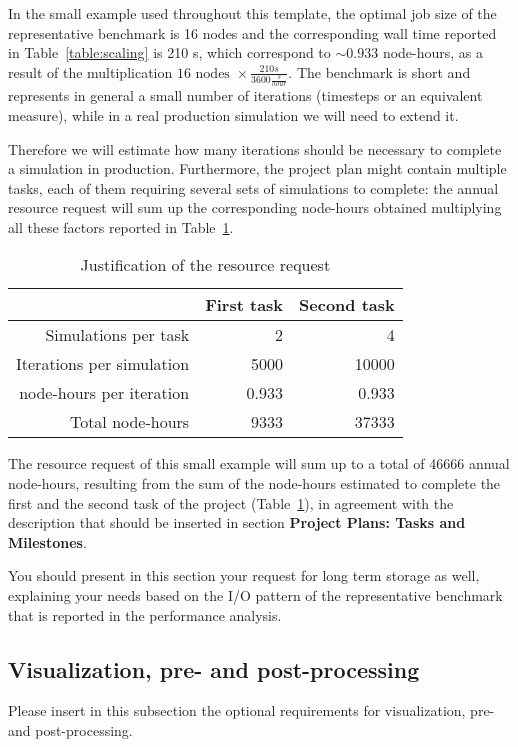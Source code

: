 \documentclass[11pt]{article}
\begin{document}
In the small example used throughout this template, the optimal job size of the representative 
benchmark is 16 nodes and the corresponding wall time reported in Table~\ref{table:scaling} is 
210 s, which correspond to $\sim 0.933$ node-hours, as a result of the multiplication 
$16 \mbox { nodes } \times \frac{210 s}{3600 \frac{s}{hour}}$. 
The benchmark is short and represents in general a small number of iterations (timesteps or 
an equivalent measure), while in a real production simulation we will need to extend it.

Therefore we will estimate how many iterations should be necessary to complete a simulation 
in production. Furthermore, the project plan might contain multiple tasks, each of them requiring 
several sets of simulations to complete: the annual resource request will sum up the corresponding 
node-hours obtained multiplying all these factors reported in Table~\ref{table:resource_request}. 
\begin{table}[H]
 \begin{center}
  \begin{tabular}{@{}*3{r}@{}}
   \hline \hline
   & First task & Second task \\ 
   \hline \hline
   Simulations per task & 2 & 4 \\
   Iterations per simulation & 5000 & 10000 \\
   node-hours per iteration & 0.933 & 0.933 \\
   Total node-hours & 9333 & 37333 \\
   \hline \hline
  \end{tabular}
 \end{center}
 \caption{Justification of the resource request}
 \label{table:resource_request}
\end{table}
The resource request of this small example will sum up to a total of 46666 annual node-hours, resulting from the 
sum of the node-hours estimated to complete the first and the second task of the project 
(Table~\ref{table:resource_request}), in agreement with the description that should be inserted in 
section \textbf{Project Plans: Tasks and Milestones}. 

You should present in this section your request for long term storage as well, explaining your needs 
based on the I/O pattern of the representative benchmark that is reported in the performance analysis. 
 
\subsection{Visualization, pre- and post-processing}
Please insert in this subsection the optional requirements for visualization, pre- and post-processing.
\end{document}

